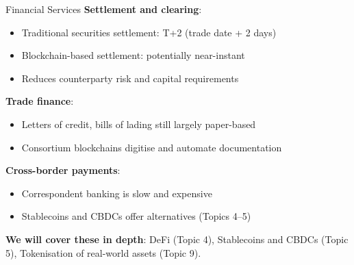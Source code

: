 \documentclass[10pt]{beamer}
\begin{document}
\begin{frame}{Financial Services}
  \textbf{Settlement and clearing}:
  \begin{itemize}
    \item Traditional securities settlement: T+2 (trade date + 2 days)
    \item Blockchain-based settlement: potentially near-instant
    \item Reduces counterparty risk and capital requirements
  \end{itemize}
  
  \vspace{0.5em}
  \textbf{Trade finance}:
  \begin{itemize}
    \item Letters of credit, bills of lading still largely paper-based
    \item Consortium blockchains digitise and automate documentation
  \end{itemize}
  
  \vspace{0.5em}
  \textbf{Cross-border payments}:
  \begin{itemize}
    \item Correspondent banking is slow and expensive
    \item Stablecoins and CBDCs offer alternatives (Topics 4--5)
  \end{itemize}
  
  \vspace{1em}
  \textbf{We will cover these in depth}: DeFi (Topic 4), Stablecoins and CBDCs (Topic 5), Tokenisation of real-world assets (Topic 9).
\end{frame}
\end{document}
